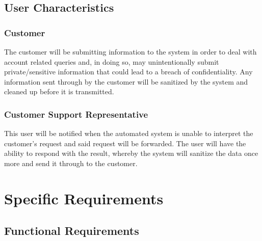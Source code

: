 \documentclass[11pt]{article}
\begin{document}
\subsection{User Characteristics}

\subsubsection{Customer}
The customer will be submitting information to the system in order to deal with account related queries and, in doing so, may unintentionally submit private/sensitive information that could lead to a breach of confidentiality. Any information sent through by the customer will be sanitized by the system and cleaned up before it is transmitted.

\subsubsection{Customer Support Representative}
This user will be notified when the automated system is unable to interpret the customer's request and said request will be forwarded. The user will have the ability to respond with the result, whereby the system will sanitize the data once more and send it through to the customer.

\section{Specific Requirements}

\subsection{Functional Requirements} %
\end{document}
